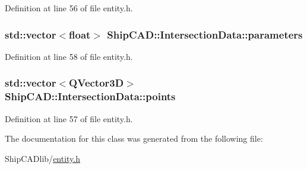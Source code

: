 Definition at line 56 of file entity.\+h.

\subsubsection[{\texorpdfstring{parameters}{parameters}}]{\setlength{\rightskip}{0pt plus 5cm}std\+::vector$<$float$>$ Ship\+C\+A\+D\+::\+Intersection\+Data\+::parameters}\hypertarget{classShipCAD_1_1IntersectionData_a06fcbb71243644bdea0e5b86da3b191c}{}\label{classShipCAD_1_1IntersectionData_a06fcbb71243644bdea0e5b86da3b191c}


Definition at line 58 of file entity.\+h.

\subsubsection[{\texorpdfstring{points}{points}}]{\setlength{\rightskip}{0pt plus 5cm}std\+::vector$<$Q\+Vector3D$>$ Ship\+C\+A\+D\+::\+Intersection\+Data\+::points}\hypertarget{classShipCAD_1_1IntersectionData_a926e126e42d95e01b39e2750a0e1fb95}{}\label{classShipCAD_1_1IntersectionData_a926e126e42d95e01b39e2750a0e1fb95}


Definition at line 57 of file entity.\+h.



The documentation for this class was generated from the following file\+:\begin{DoxyCompactItemize}
\item 
Ship\+C\+A\+Dlib/\hyperlink{entity_8h}{entity.\+h}\end{DoxyCompactItemize}
